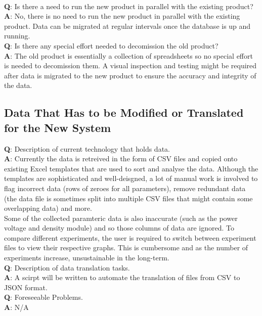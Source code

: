 \documentclass[12pt]{article}
\begin{document}
\ \\
\textbf{Q}: Is there a need to run the new product in parallel with the existing product?\\
\textbf{A}: No, there is no need to run the new product in parallel with the existing product. Data can be migrated at regular intervals once
the database is up and running.\\
\newline
\textbf{Q}: Is there any special effort needed to decomission the old product?\\
\textbf{A}: The old product is essentially a collection of spreadsheets so no special effort is needed to decomission them. A visual inspection
and testing might be required after data is migrated to the new product to ensure the accuracy and integrity of the data.

\subsection{Data That Has to be Modified or Translated for the New System}
\textbf{Q}: Description of current technology that holds data.\\
\textbf{A}: Currently the data is retreived in the form of CSV files and copied onto existing Excel templates that are used to sort and analyse 
the data. Although the templates are sophisticated and well-deisgned, a lot of manual work is involved to flag incorrect data (rows of zeroes for 
all parameters), remove redundant data (the data file is sometimes split into multiple CSV files that might contain some overlapping data) and more.\\
\newline
Some of the collected paramteric data is also inaccurate (such as the power voltage and density module) and so those columns of data are ignored.
To compare different experiments, the user is required to switch between experiment files to view their respective graphs. This is cumbersome and as 
the number of experiments increase, unsustainable in the long-term.\\
\newline
\textbf{Q}: Description of data translation tasks.\\
\textbf{A}: A scirpt will be written to automate the translation of files from CSV to JSON format.\\
\newline
\textbf{Q}: Foreseeable Problems.\\
\textbf{A}: N/A
\end{document}
